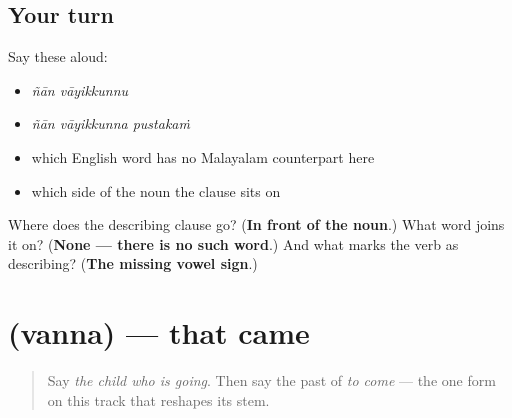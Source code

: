 \subsection*{Your turn}
Say these aloud:

\begin{itemize}
\raggedright
  \item \emph{ñān vāyikkunnu}
  \item \emph{ñān vāyikkunna pustakaṁ}
  \item which English word has no Malayalam counterpart here
  \item which side of the noun the clause sits on
\end{itemize}

\begin{tcolorbox}[breakable,colback=teal!4,colframe=teal!35!black,title={Before you move on}]
Where does the describing clause go? (\textbf{In front of the noun}.) What word joins it on? (\textbf{None — there is no such word}.) And what marks the verb as describing? (\textbf{The missing vowel sign}.)
\end{tcolorbox}
\section[\texorpdfstring{\ml{വന്ന} (vanna)}{വന്ന (vanna)}]{ (vanna) — that came}

\label{lesson:ML-C90-past-participle}



\begin{quote}
Say \emph{the child who is going}. Then say the past of \emph{to come} — the one form on this track that reshapes its stem.
\end{quote}

